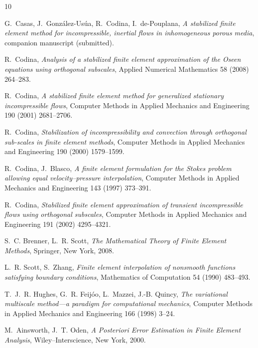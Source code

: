 \documentclass[11pt]{article}
\theoremstyle{remark}
\begin{document}
\begin{thebibliography}{10}

G.~Casas, J.~Gonz\'alez-Us\'ua, R.~Codina, I.~de-Pouplana,
\emph{A stabilized finite element method for incompressible, inertial flows in
inhomogeneous porous media}, companion manuscript (submitted).

R.~Codina,
\emph{Analysis of a stabilized finite element approximation of the Oseen equations
using orthogonal subscales},
Applied Numerical Mathematics 58 (2008) 264--283.

R.~Codina,
\emph{A stabilized finite element method for generalized stationary incompressible
flows},
Computer Methods in Applied Mechanics and Engineering 190 (2001) 2681--2706.

R.~Codina,
\emph{Stabilization of incompressibility and convection through orthogonal sub-scales
in finite element methods},
Computer Methods in Applied Mechanics and Engineering 190 (2000) 1579--1599.

R.~Codina, J.~Blasco,
\emph{A finite element formulation for the Stokes problem allowing equal
velocity--pressure interpolation},
Computer Methods in Applied Mechanics and Engineering 143 (1997) 373--391.

R.~Codina,
\emph{Stabilized finite element approximation of transient incompressible flows using
orthogonal subscales},
Computer Methods in Applied Mechanics and Engineering 191 (2002) 4295--4321.

S.~C. Brenner, L.~R. Scott,
\emph{The Mathematical Theory of Finite Element Methods},
Springer, New York, 2008.

L.~R. Scott, S.~Zhang,
\emph{Finite element interpolation of nonsmooth functions satisfying boundary
conditions},
Mathematics of Computation 54 (1990) 483--493.

T.~J.~R. Hughes, G.~R. Feij\'oo, L.~Mazzei, J.-B. Quincy,
\emph{The variational multiscale method---a paradigm for computational mechanics},
Computer Methods in Applied Mechanics and Engineering 166 (1998) 3--24.

M.~Ainsworth, J.~T. Oden,
\emph{A Posteriori Error Estimation in Finite Element Analysis},
Wiley--Interscience, New York, 2000.

\end{thebibliography}
\end{document}
